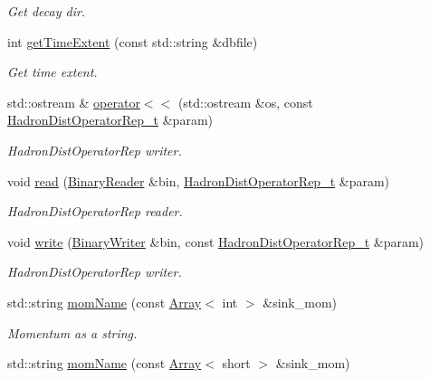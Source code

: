 \begin{DoxyCompactItemize}
\begin{DoxyCompactList}\small\item\em Get decay dir. \end{DoxyCompactList}\item 
int \mbox{\hyperlink{namespaceHadron_a660c9f3adc1525c9d326b23398d09494}{get\+Time\+Extent}} (const std\+::string \&dbfile)
\begin{DoxyCompactList}\small\item\em Get time extent. \end{DoxyCompactList}\item 
std\+::ostream \& \mbox{\hyperlink{namespaceHadron_a4ff4eac2687982e6a251bf3524940b01}{operator$<$$<$}} (std\+::ostream \&os, const \mbox{\hyperlink{classHadron_1_1HadronDistOperatorRep__t}{Hadron\+Dist\+Operator\+Rep\+\_\+t}} \&param)
\begin{DoxyCompactList}\small\item\em Hadron\+Dist\+Operator\+Rep writer. \end{DoxyCompactList}\item 
void \mbox{\hyperlink{namespaceHadron_adeba574c3428db28a2e7054d5f4d32d6}{read}} (\mbox{\hyperlink{classADATIO_1_1BinaryReader}{Binary\+Reader}} \&bin, \mbox{\hyperlink{classHadron_1_1HadronDistOperatorRep__t}{Hadron\+Dist\+Operator\+Rep\+\_\+t}} \&param)
\begin{DoxyCompactList}\small\item\em Hadron\+Dist\+Operator\+Rep reader. \end{DoxyCompactList}\item 
void \mbox{\hyperlink{namespaceHadron_a9edaeb80eb507096c7529be211efa667}{write}} (\mbox{\hyperlink{classADATIO_1_1BinaryWriter}{Binary\+Writer}} \&bin, const \mbox{\hyperlink{classHadron_1_1HadronDistOperatorRep__t}{Hadron\+Dist\+Operator\+Rep\+\_\+t}} \&param)
\begin{DoxyCompactList}\small\item\em Hadron\+Dist\+Operator\+Rep writer. \end{DoxyCompactList}\item 
std\+::string \mbox{\hyperlink{namespaceHadron_ad1ac646aa2d410cc55e4b11c925867a6}{mom\+Name}} (const \mbox{\hyperlink{classXMLArray_1_1Array}{Array}}$<$ int $>$ \&sink\+\_\+mom)
\begin{DoxyCompactList}\small\item\em Momentum as a string. \end{DoxyCompactList}\item 
std\+::string \mbox{\hyperlink{namespaceHadron_aaac56034a899893bfbd130cdd0427018}{mom\+Name}} (const \mbox{\hyperlink{classXMLArray_1_1Array}{Array}}$<$ short $>$ \&sink\+\_\+mom)

\end{DoxyCompactItemize}
